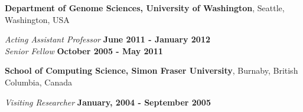 \documentclass[margin,line]{res}
\newcommand{\junk}[1]{}
\begin{document}
\begin{resume}
                 {\bf Department of Genome Sciences, University of Washington},
                         Seattle, Washington, USA
                         
                         \vspace{-.3cm}
                                {\em Acting Assistant Professor} \hfill {\bf June 2011 - January 2012} \\                           %
                                      {\em Senior Fellow} \hfill {\bf October 2005 - May 2011}
                                       
                          {\bf School of Computing Science, Simon Fraser University},
                          Burnaby, British Columbia, Canada

                          \vspace{-.3cm}
                                         {\em Visiting Researcher} \hfill {\bf January, 2004 - September 2005}\\
                                         \junk{
                                         Worked on RNA-RNA interaction algorithms, and RNA secondary structure
                                         motif discovery problems, collaborating with Peter Unrau, Kaizhong
                                         Zhang, and Jeremy Buhler.
                                         }
                                       
                                       
                                       
                                       \junk{
                                         {\bf Department of EECS, Case Western Reserve University},
                                         Cleveland, Ohio, USA
                                         
                                         \vspace{-.2cm}
                                                {\em Research \& Teaching Assistant} \hfill {\bf August 2000 - December 2003}\\
                                                Worked on phylogenetic tree algorithms, sequence analysis, and RNA-RNA
                                                interaction algorithms, collaborating with Evan E. Eichler and Joe
                                                Nadeau.                                                 
                                                
}
\end{resume}
\end{document}
